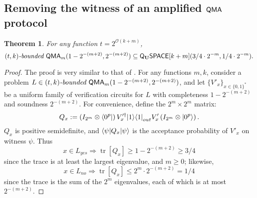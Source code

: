 \documentclass[11pt]{article}
\newtheorem{theorem}{Theorem}
\theoremstyle{definition}
\theoremstyle{remark}
\newcommand\QMA{{\sf{QMA}}}
\newcommand\bddQMA[5]{{\left(#1,#2\right)}\textit{-bounded }\QMA_{#3}(#4,#5)}
\newcommand{\classfont}{\sf}
\newcommand{\Unitary}{\mathbf{U}}
\newcommand{\unitaryQSPACE}[3]{{\classfont{Q}_\Unitary\classfont{SPACE}}[#1](#2,#3)}
\newcommand\bigoh{\mathcal{O}}
\DeclareMathOperator{\tr}{tr}
\begin{document}
\subsection{Removing the witness of an amplified $\QMA$ protocol}\label{app: removingwitness}
\begin{theorem} \label{thm:pqpspace simulation} For any function $t=2^{\bigoh(k+m)}$,
\[
\bddQMA{t}{k}{m}{1-2^{-(m+2)}}{2^{-(m+2)}}\subseteq
\unitaryQSPACE{k+m}{3/4\cdot 2^{-m}}{1/4 \cdot 2^{-m}}.
\]
\end{theorem}
\begin{proof}
The proof is very similar to that of \cite[Theorem 3.6]{mw05}. For any functions $m, k$, consider a problem $L\in\bddQMA{t}{k}{m}{1-2^{-(m+2)}}{2^{-(m+2)}}$, and let $\{V'_x\}_{x\in\{0,1\}^*}$ be a uniform family of verification circuits for $L$ with completeness $1-2^{-(m+2)}$ and soundness $2^{-(m+2)}$. 
For convenience, define the $2^m \times 2^m$ matrix:
\begin{equation}
Q_x := \left(I_{2^m}\otimes {\left\langle{0^p}\right\vert}\right) V'^\dagger_x {\left\vert{1}\right\rangle}{\left\langle{1}\right\vert}_{out} V'_x \left(I_{2^m}\otimes {\left\vert{0^p}\right\rangle}\right).
\end{equation}
$Q_x$ is positive semidefinite, and ${\left\langle{\psi}\right\vert}Q_x{\left\vert{\psi}\right\rangle}$ is the acceptance probability of $V'_x$ on witness $\psi$. Thus
\begin{equation}
x\in L_{yes} \Rightarrow \tr[Q_x]\ge 1 - 2^{-(m+2)} \ge 3/4
\end{equation}
since the trace is at least the largest eigenvalue, and $m\geq 0$; likewise,
\begin{equation}
x\in L_{no} \Rightarrow \tr[Q_x]\le 2^m \cdot 2^{-(m+2)} = 1/4
\end{equation}
since the trace is the sum of the $2^m$ eigenvalues, each of which is at most $2^{-(m+2)}$. 


\end{proof}
\end{document}
